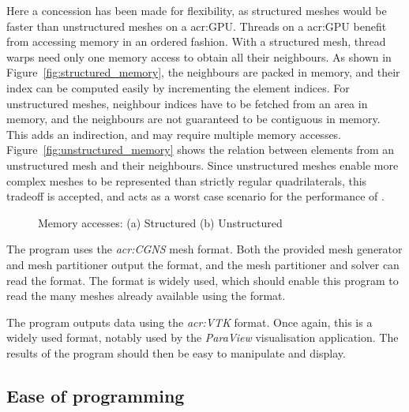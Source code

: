 Here a concession has been made for flexibility, as structured meshes would be faster than
unstructured meshes on a \acrshort{acr:GPU}. Threads on a \acrshort{acr:GPU} benefit from accessing
memory in an ordered fashion. With a structured mesh, thread warps need only one memory access to
obtain all their neighbours. As shown in Figure~\ref{fig:structured_memory}, the neighbours are
packed in memory, and their index can be computed easily by incrementing the element indices. For
unstructured meshes, neighbour indices have to be fetched from an area in memory, and the neighbours
are not guaranteed to be contiguous in memory. This adds an indirection, and may require multiple
memory accesses. Figure~\ref{fig:unstructured_memory} shows the relation between elements from an
unstructured mesh and their neighbours. Since unstructured meshes enable more complex meshes to be
represented than strictly regular quadrilaterals, this tradeoff is accepted, and acts as a worst
case scenario for the performance of .

\begin{figure}[H]
    \centering
    \hfill
    \caption{Memory accesses: (a) Structured (b) Unstructured}\label{fig:mesh_memory}
\end{figure}

The program uses the \textit{\acrfull{acr:CGNS}} mesh format. Both the provided mesh generator and
mesh partitioner output the format, and the mesh partitioner and solver can read the format. The
format is widely used, which should enable this program to read the many meshes already available
using the format.

The program outputs data using the \textit{\acrfull{acr:VTK}} format. Once again, this is a widely
used format, notably used by the \textit{ParaView} visualisation application. The results of the
program should then be easy to manipulate and display.

\subsection{Ease of programming}\label{subsection:graphics_processing_units:data_structure:ease_of_programming}

